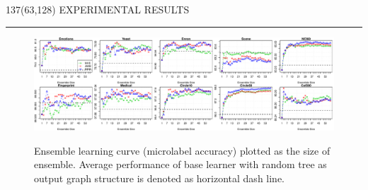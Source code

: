 \documentclass[a4poster]{article}
\begin{document}
\begin{textblock}{137}(63,128)
	\sffamily
	\Large{\color{sciorange}EXPERIMENTAL RESULTS}\small\\
	\rule[3mm]{137mm}{0.1pt}
	
	\vspace{-4mm}	
	
	\begin{figure}[t]
	\vspace{-5mm}
	\begin{center}
		\caption{Ensemble learning curve (microlabel accuracy) plotted as the size of ensemble. Average performance of base learner with random tree as output graph structure is denoted as horizontal dash line.}
		\includegraphics[page={1},width=1 \columnwidth]{./ensemble_curve.pdf}
	\label{ensemblemethodeffect}
	\end{center}
	\end{figure}
	
	\vspace{-14mm}
	

\end{textblock}
\end{document}
